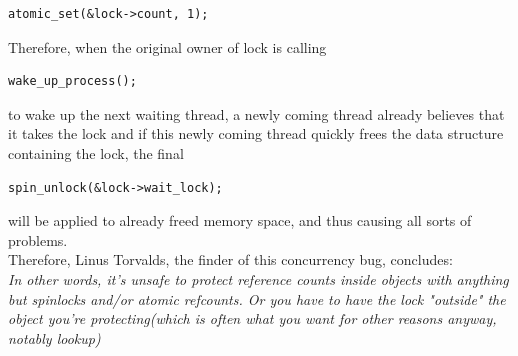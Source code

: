 \documentclass[10pt,preprint]{sigplanconf}
\begin{document}
\begin{lstlisting}
atomic_set(&lock->count, 1);
\end{lstlisting}
Therefore, when the original owner of lock is calling 
\begin{lstlisting}
wake_up_process(); 
\end{lstlisting}
to wake up the next waiting thread, a newly coming thread already believes that it takes the lock and if this newly coming thread quickly frees the data structure containing the lock, the final 
\begin{lstlisting}
spin_unlock(&lock->wait_lock);
\end{lstlisting}
will be applied to already freed memory space, and thus causing all sorts of problems. \\
Therefore, Linus Torvalds, the finder of this concurrency bug, concludes:\\

\textit{In other words, it's unsafe to protect reference counts inside objects with anything but spinlocks and/or atomic refcounts. Or you have to have the lock "outside" the object you're protecting(which is often what you want for other reasons anyway, notably lookup)}\\



% 
\end{document}
